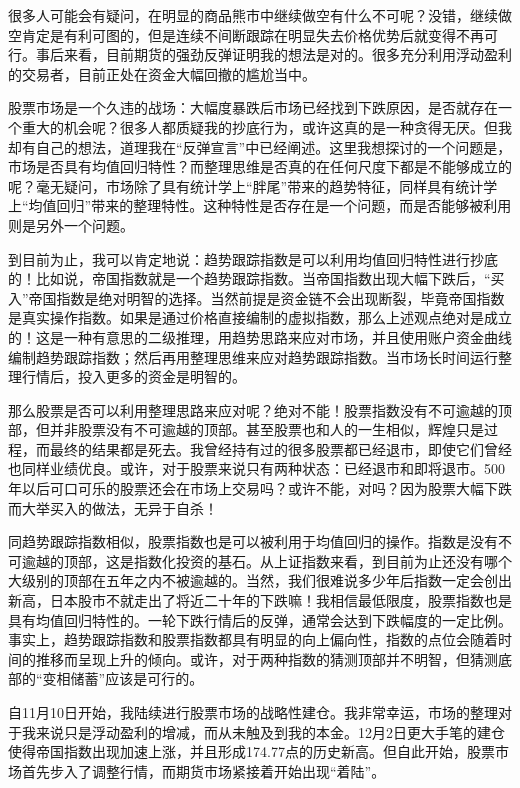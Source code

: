 很多人可能会有疑问，在明显的商品熊市中继续做空有什么不可呢？没错，继续做空肯定是有利可图的，但是连续不间断跟踪在明显失去价格优势后就变得不再可行。事后来看，目前期货的强劲反弹证明我的想法是对的。很多充分利用浮动盈利的交易者，目前正处在资金大幅回撤的尴尬当中。

股票市场是一个久违的战场：大幅度暴跌后市场已经找到下跌原因，是否就存在一个重大的机会呢？很多人都质疑我的抄底行为，或许这真的是一种贪得无厌。但我却有自己的想法，道理我在“反弹宣言”中已经阐述。这里我想探讨的一个问题是，市场是否具有均值回归特性？而整理思维是否真的在任何尺度下都是不能够成立的呢？毫无疑问，市场除了具有统计学上“胖尾”带来的趋势特征，同样具有统计学上“均值回归”带来的整理特性。这种特性是否存在是一个问题，而是否能够被利用则是另外一个问题。

到目前为止，我可以肯定地说：趋势跟踪指数是可以利用均值回归特性进行抄底的！比如说，帝国指数就是一个趋势跟踪指数。当帝国指数出现大幅下跌后，“买入”帝国指数是绝对明智的选择。当然前提是资金链不会出现断裂，毕竟帝国指数是真实操作指数。如果是通过价格直接编制的虚拟指数，那么上述观点绝对是成立的！这是一种有意思的二级推理，用趋势思路来应对市场，并且使用账户资金曲线编制趋势跟踪指数；然后再用整理思维来应对趋势跟踪指数。当市场长时间运行整理行情后，投入更多的资金是明智的。

那么股票是否可以利用整理思路来应对呢？绝对不能！股票指数没有不可逾越的顶部，但并非股票没有不可逾越的顶部。甚至股票也和人的一生相似，辉煌只是过程，而最终的结果都是死去。我曾经持有过的很多股票都已经退市，即使它们曾经也同样业绩优良。或许，对于股票来说只有两种状态：已经退市和即将退市。500年以后可口可乐的股票还会在市场上交易吗？或许不能，对吗？因为股票大幅下跌而大举买入的做法，无异于自杀！

同趋势跟踪指数相似，股票指数也是可以被利用于均值回归的操作。指数是没有不可逾越的顶部，这是指数化投资的基石。从上证指数来看，到目前为止还没有哪个大级别的顶部在五年之内不被逾越的。当然，我们很难说多少年后指数一定会创出新高，日本股市不就走出了将近二十年的下跌嘛！我相信最低限度，股票指数也是具有均值回归特性的。一轮下跌行情后的反弹，通常会达到下跌幅度的一定比例。事实上，趋势跟踪指数和股票指数都具有明显的向上偏向性，指数的点位会随着时间的推移而呈现上升的倾向。或许，对于两种指数的猜测顶部并不明智，但猜测底部的“变相储蓄”应该是可行的。

自11月10日开始，我陆续进行股票市场的战略性建仓。我非常幸运，市场的整理对于我来说只是浮动盈利的增减，而从未触及到我的本金。12月2日更大手笔的建仓使得帝国指数出现加速上涨，并且形成174.77点的历史新高。但自此开始，股票市场首先步入了调整行情，而期货市场紧接着开始出现“着陆”。


